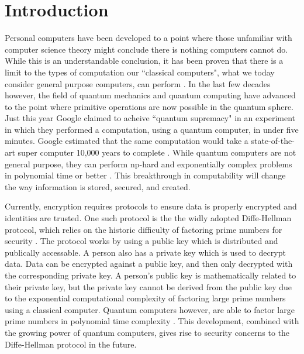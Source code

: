 \chapter{Introduction}
\label{chap:introduction}

Personal computers have been developed to a point where those unfamiliar with computer science theory might conclude there is nothing computers cannot do.
While this is an understandable conclusion, it has been proven that there is a limit to the types of computation our ``classical computers", what we today consider general purpose computers, can perform \cite{linz}.
In the last few decades however, the field of quantum mechanics and quantum computing have advanced to the point where primitive operations are now possible in the quantum sphere.
Just this year Google claimed to acheive ``quantum supremacy" in an experiment in which they performed a computation, using a quantum computer, in under five minutes. 
Google estimated that the same computation would take a state-of-the-art super computer 10,000 years to complete \cite{quantum_supremacy}. 
While quantum computers are not general purpose, they can perform np-hard and exponentially complex problems in polynomial time or better \cite{TODO}.
This breakthrough in computability will change the way information is stored, secured, and created.


Currently, encryption requires protocols to ensure data is properly encrypted and identities are trusted.
One such protocol is the the widly adopted Diffe-Hellman protocol, which relies on the historic difficulty of factoring prime numbers for security \cite{qc:agi}.
The protocol works by using a public key which is distributed and publically accessable.
A person also has a private key which is used to decrypt data.
Data can be encrypted against a public key, and then only decrypted with the corresponding private key.
A person's public key is mathematically related to their private key, but the private key cannot be derived from the public key due to the exponential computational complexity of factoring large prime numbers using a classical computer.
Quantum computers however, are able to factor large prime numbers in polynomial time complexity \cite{doi:10.1137/S0036144598347011}.
This development, combined with the growing power of quantum computers, gives rise to security concerns to the Diffe-Hellman protocol in the future.

